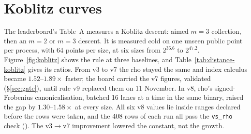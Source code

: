 \begin{table}[t]
\centering\small
\setlength{\tabcolsep}{4pt}

\caption[]{Leaderboard Table~C, all nine rows, unvalidated (pre-gate):
\texttt{VALIDATION.json} missing, band not computable. $S$ per $\sqrt r$
per target in batched-addition units; reference: batch rho with signed
Frobenius and negation on the same 32 targets. IC/ref before: \S21 and
\S22's baseline. Speed-up: \S22's descent over its baseline. Base: factor
base points. Source: 
(). Data:
.}
\label{tab:fr-boardC}
\end{table}

\section{Koblitz curves}

The leaderboard's Table~A measures a Koblitz descent: aimed $m=3$
collection, then an $m=2$ or $m=3$ descent. It is measured cold on one
unseen public point per process, with 64 points per size, at six sizes
from $2^{36.6}$ to $2^{47.2}$. Figure~\ref{fig:koblitz} shows the rule at
three baselines, and Table~\ref{tab:distance-koblitz} gives its ratios.
From v3 to v7 the rho stayed the same and index calculus became
$1.52$--$1.89\times$ faster; the board carried the v7 figures, validated
(\S\ref{sec:gate}), until rule v9 replaced them on 11 November. In v8, rho's signed-Frobenius canonicalisation, batched
16 lanes at a time in the same binary, raised the gap by
$1.30$--$1.58\times$ at every size. All six v8 values lie inside ranges
declared before the rows were taken, and the 408 rows of each run all pass
the \texttt{vs\_rho} check
(). The v3$\to$v7
improvement lowered the constant, not the growth.

